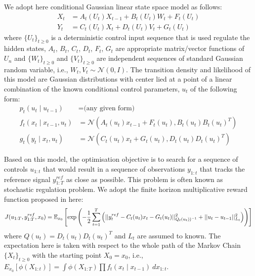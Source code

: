 We adopt here conditional Gaussian linear state space model as follows:
\begin{align}
  X_t &= A_t(U_t)X_{t-1} + B_t(U_t)W_t + F_t(U_t) \nonumber \\
  Y_t &= C_t(U_t)X_t + D_t(U_t)V_t + G_t(U_t)
\label{eq:model}
\end{align}
where $\{U_t\}_{t \geq 0}$ is a deterministic control input sequence that is used regulate the hidden states, $A_t$, $B_t$, $C_t$, $D_t$, $F_t$, $G_t$ are appropriate matrix/vector functions of $U_n$ and  $\{W_t\}_{t \geq 0}$ and  $\{V_t\}_{t \geq 0}$ are independent sequences of standard Gaussian random variable, i.e., $W_t, V_t \sim \mathcal{N}(0,I)$. The transition density and likelihood of this model are Gaussian distributions with center lied at a point of a linear combination of the known conditional control parameters, $u_t$ of the following form:
\begin{align}
  p_t(u_t \mid u_{t-1}) &= \textrm{(any given form)} \nonumber \\
  f_t(x_t \mid x_{t-1}, u_t) &= \mathcal{N}(A_t(u_t) x_{t-1} + F_t(u_t), B_t(u_t)B_t(u_t)^T) \nonumber \\
  g_t(y_t \mid x_t, u_t)    &= \mathcal{N}(C_t(u_t) x_t + G_t(u_t), D_t(u_t)D_t(u_t)^T)
\end{align}

Based on this model, the optimisation objective is to search for a sequence of controls $u_{1:t}$ that would result in a sequence of observations $y_{1:t}$ that tracks the reference signal $y^{ref}_{1:T}$ as close as possible. This problem is often known as stochastic regulation problem. We adopt the finite horizon multiplicative reward function proposed in \cite{NK11} here:
\begin{equation}
  J(u_{1:T},y^{ref}_{1:T}, x_0) = \operatorname{\mathbb{E}}_{x_0}\left[\exp\left( -\dfrac{1}{2}\displaystyle\sum^T_{t=1}\left(\vert\vert y^{ref}_t - C_t(u_t)x_t - G_t(u_t) \vert\vert^2_{Q_t(u_t))^{-1}}  + \vert\vert u_t - u_{t-1} \vert\vert^2_{L_t}\right) \right) \right]
\end{equation}
where $Q(u_t) = D_t(u_t)D_t(u_t)^T$ and $L_t$ are assumed to known. The expectation here is taken with respect to the whole path of the Markov Chain $\{X_t\}_{t \geq 0}$ with the starting point $X_0 = x_0$,  i.e., $E_{x_0}[\phi(X_{1:t})] = \displaystyle\int \phi(X_{1:T}) \prod f_t(x_t \mid x_{t-1})~dx_{1:t}$.

